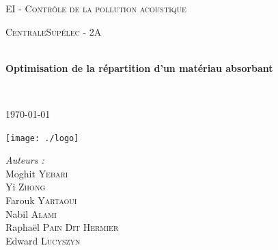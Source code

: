 \begin{titlepage}
\begin{center}


\LARGE \textsc{EI - Contrôle de la pollution acoustique}

\vspace{0.2cm}

\Large \textsc{CentraleSupélec - 2A}

\vspace{0.3cm}

\HRule \\[0.4cm]

{\huge \bfseries Optimisation de la répartition d'un matériau absorbant\\
[0.2cm]}

\HRule \\[0.4cm]

\vspace{2cm}

\textsc{\today}

\vspace{2cm}

\texttt{[image: ./logo]}~\\[3cm]

\begin{minipage}{0.4\textwidth}
\begin{spacing}{1.125}
\begin{flushleft} \Large
    \textit{Auteurs : } \\
	Moghit \textsc{Yebari} \\
    Yi \textsc{Zhong} \\
	Farouk \textsc{Yartaoui} \\
    Nabil \textsc{Alami} \\
    Raphaël \textsc{Pain Dit Hermier} \\
    Edward \textsc{Lucyszyn}
\end{flushleft}
\end{spacing}
\end{minipage}

\vfill

\end{center}
\end{titlepage}